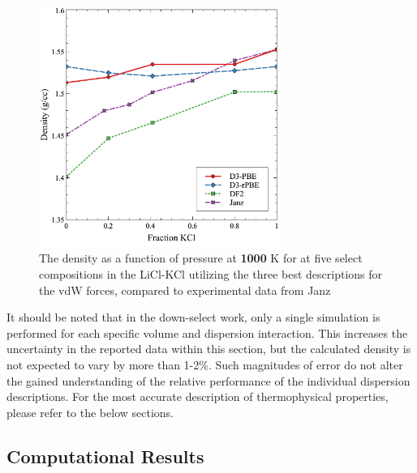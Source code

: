 \documentclass[review]{elsarticle}
\providecommand{\DIFaddtex}[1]{{\bf #1}} %
\providecommand{\DIFdeltex}[1]{} %
\providecommand{\DIFaddFL}[1]{\DIFadd{#1}} %
\providecommand{\DIFdelFL}[1]{\DIFdel{#1}} %
\providecommand{\DIFaddbeginFL}{} %
\providecommand{\DIFaddendFL}{} %
\providecommand{\DIFdelbeginFL}{} %
\providecommand{\DIFdelendFL}{} %
\providecommand{\DIFadd}[1]{\texorpdfstring{\DIFaddtex{#1}}{#1}} %
\providecommand{\DIFdel}[1]{\texorpdfstring{\DIFdeltex{#1}}{}} %
\newcommand{\DIFscaledelfig}{0.5}
\newlength{\DIFdelgraphicswidth} %
\newlength{\DIFdelgraphicsheight} %
\newcommand{\DIFaddincludegraphics}[2][]{{\color{blue}\fbox{\DIFOincludegraphics[#1]{#2}}}} %
\newcommand{\DIFdelincludegraphics}[2][]{%
\sbox{\DIFdelgraphicsbox}{\DIFOincludegraphics[#1]{#2}}%
\settoboxwidth{\DIFdelgraphicswidth}{\DIFdelgraphicsbox} %
\settoboxtotalheight{\DIFdelgraphicsheight}{\DIFdelgraphicsbox} %
\scalebox{\DIFscaledelfig}{%
\parbox[b]{\DIFdelgraphicswidth}{\usebox{\DIFdelgraphicsbox}\\[-\baselineskip] \rule{\DIFdelgraphicswidth}{0em}}\llap{\resizebox{\DIFdelgraphicswidth}{\DIFdelgraphicsheight}{%
\setlength{\unitlength}{\DIFdelgraphicswidth}%
\begin{picture}(1,1)%
\thicklines\linethickness{2pt} %
{\color[rgb]{1,0,0}\put(0,0){\framebox(1,1){}}}%
{\color[rgb]{1,0,0}\put(0,0){\line( 1,1){1}}}%
{\color[rgb]{1,0,0}\put(0,1){\line(1,-1){1}}}%
\end{picture}%
}\hspace*{3pt}}} %
} %
\DeclareRobustCommand{\DIFaddbeginFL}{\DIFOaddbeginFL \let\includegraphics\DIFaddincludegraphics} %
\DeclareRobustCommand{\DIFaddendFL}{\DIFOaddendFL \let\includegraphics\DIFOincludegraphics} %
\DeclareRobustCommand{\DIFdelbeginFL}{\DIFOdelbeginFL \let\includegraphics\DIFdelincludegraphics} %
\DeclareRobustCommand{\DIFdelendFL}{\DIFOaddendFL \let\includegraphics\DIFOincludegraphics} %
\begin{document}
\begin{figure}[h]
 \centering
 \DIFdelbeginFL %
\DIFdelendFL \DIFaddbeginFL \includegraphics[width=0.7\textwidth]{images/final_disp.jpg} 
 \DIFaddendFL \caption{The density as a function of pressure at \DIFdelbeginFL \DIFdelFL{1100 }\DIFdelendFL \DIFaddbeginFL \DIFaddFL{1000 }\DIFaddendFL K for at five select compositions in the LiCl-KCl utilizing the three best descriptions for the vdW forces, compared to experimental data from Janz \DIFdelbeginFL \DIFdelFL{\cite{Janz1988}.}\DIFdelendFL \DIFaddbeginFL \DIFaddFL{\cite{janz1975molten,van1955electrical}}\DIFaddendFL }
 \label{fig:disp_tot}
\end{figure} 

It should be noted that in the down-select work, only a single simulation is performed for each specific volume and dispersion interaction. This increases the uncertainty in the reported data within this section, but the calculated density is not expected to vary by more than 1-2\%. Such magnitudes of error do not alter the gained understanding of the relative performance of the individual dispersion descriptions. For the most accurate description of thermophysical properties, please refer to the below sections. 

\FloatBarrier

\subsection{Computational Results}
\end{document}
